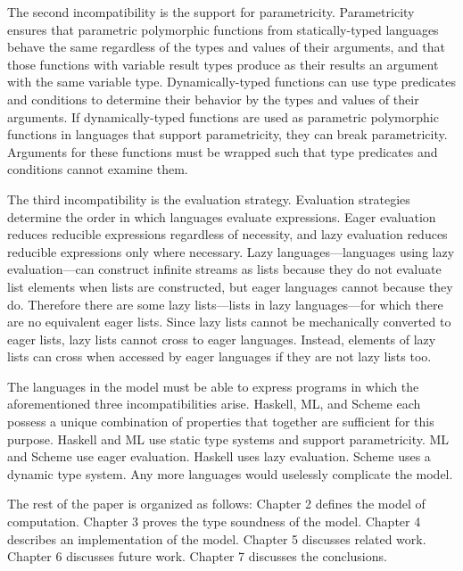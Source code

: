 The second incompatibility is the support for parametricity.  Parametricity ensures that parametric polymorphic functions from statically-typed languages behave the same regardless of the types and values of their arguments, and that those functions with variable result types produce as their results an argument with the same variable type.  Dynamically-typed functions can use type predicates and conditions to determine their behavior by the types and values of their arguments.  If dynamically-typed functions are used as parametric polymorphic functions in languages that support parametricity, they can break parametricity.  Arguments for these functions must be wrapped such that type predicates and conditions cannot examine them.

The third incompatibility is the evaluation strategy.  Evaluation strategies determine the order in which languages evaluate expressions.  Eager evaluation reduces reducible expressions regardless of necessity, and lazy evaluation reduces reducible expressions only where necessary.  Lazy languages---languages using lazy evaluation---can construct infinite streams as lists because they do not evaluate list elements when lists are constructed, but eager languages cannot because they do.  Therefore there are some lazy lists---lists in lazy languages---for which there are no equivalent eager lists.  Since lazy lists cannot be mechanically converted to eager lists, lazy lists cannot cross to eager languages.  Instead, elements of lazy lists can cross when accessed by eager languages if they are not lazy lists too.

The languages in the model must be able to express programs in which the aforementioned three incompatibilities arise.  Haskell, ML, and Scheme each possess a unique combination of properties that together are sufficient for this purpose.  Haskell and ML use static type systems and support parametricity.  ML and Scheme use eager evaluation.  Haskell uses lazy evaluation.  Scheme uses a dynamic type system.  Any more languages would uselessly complicate the model.

The rest of the paper is organized as follows: Chapter 2 defines the model of computation.  Chapter 3 proves the type soundness of the model.  Chapter 4 describes an implementation of the model.  Chapter 5 discusses related work.  Chapter 6 discusses future work.  Chapter 7 discusses the conclusions.